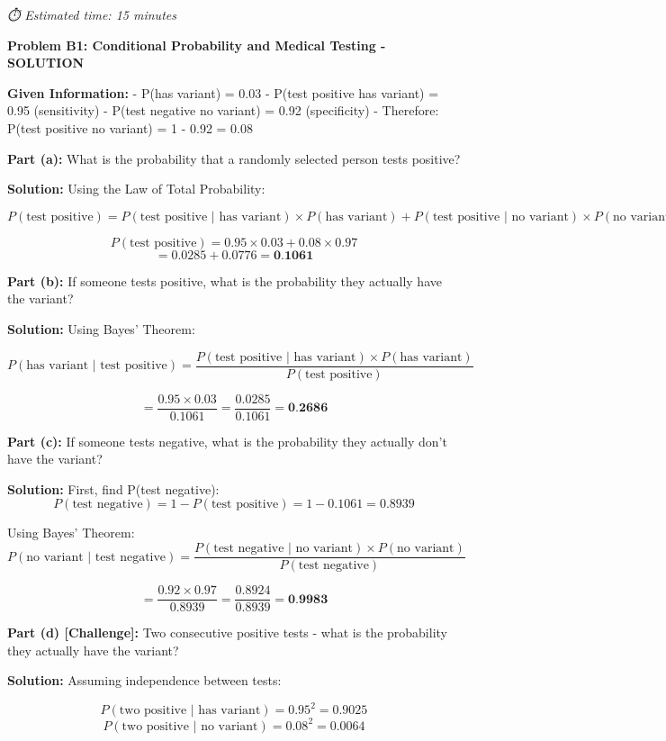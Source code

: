 \documentclass[
  11pt,
]{article}
\begin{document}
\emph{⏱️ Estimated time: 15 minutes}

\textbf{Problem B1: Conditional Probability and Medical Testing -
SOLUTION}

\textbf{Given Information:} - P(has variant) = 0.03 - P(test positive
\textbar{} has variant) = 0.95 (sensitivity) - P(test negative
\textbar{} no variant) = 0.92 (specificity) - Therefore: P(test positive
\textbar{} no variant) = 1 - 0.92 = 0.08

\textbf{Part (a):} What is the probability that a randomly selected
person tests positive?

\textbf{Solution:} Using the Law of Total Probability:

\[P(\text{test positive}) = P(\text{test positive | has variant}) \times P(\text{has variant}) + P(\text{test positive | no variant}) \times P(\text{no variant})\]

\[P(\text{test positive}) = 0.95 \times 0.03 + 0.08 \times 0.97\]
\[= 0.0285 + 0.0776 = \textbf{0.1061}\]

\textbf{Part (b):} If someone tests positive, what is the probability
they actually have the variant?

\textbf{Solution:} Using Bayes' Theorem:

\[P(\text{has variant | test positive}) = \frac{P(\text{test positive | has variant}) \times P(\text{has variant})}{P(\text{test positive})}\]

\[= \frac{0.95 \times 0.03}{0.1061} = \frac{0.0285}{0.1061} = \textbf{0.2686}\]

\textbf{Part (c):} If someone tests negative, what is the probability
they actually don't have the variant?

\textbf{Solution:} First, find P(test negative):
\[P(\text{test negative}) = 1 - P(\text{test positive}) = 1 - 0.1061 = 0.8939\]

Using Bayes' Theorem:
\[P(\text{no variant | test negative}) = \frac{P(\text{test negative | no variant}) \times P(\text{no variant})}{P(\text{test negative})}\]

\[= \frac{0.92 \times 0.97}{0.8939} = \frac{0.8924}{0.8939} = \textbf{0.9983}\]

\textbf{Part (d) {[}Challenge{]}:} Two consecutive positive tests - what
is the probability they actually have the variant?

\textbf{Solution:} Assuming independence between tests:

\[P(\text{two positive | has variant}) = 0.95^2 = 0.9025\]
\[P(\text{two positive | no variant}) = 0.08^2 = 0.0064\]
\end{document}
